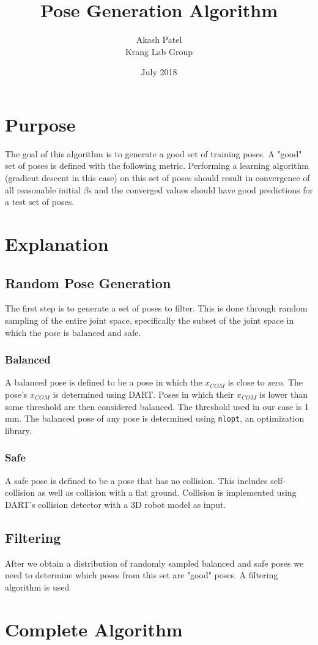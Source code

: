 \documentclass[10pt, letterpaper]{article}
\title{Pose Generation Algorithm}
\author{Akash Patel\\ Krang Lab Group}
\date{July 2018}
\begin{document}
\maketitle

\section{Purpose}

The goal of this algorithm is to generate a good set of training poses. A "good"
set of poses is defined with the following metric. Performing a learning
algorithm (gradient descent in this case) on this set of poses should result in
convergence of all reasonable initial $\beta$s and the converged values should
have good predictions for a test set of poses.

\section{Explanation}

\subsection{Random Pose Generation}

The first step is to generate a set of poses to filter. This is done through
random sampling of the entire joint space, specifically the subset of the joint
space in which the pose is balanced and safe.

\subsubsection{Balanced}
A balanced pose is defined to be a pose in which the $x_{COM}$ is close to
zero. The pose's $x_{COM}$ is determined using DART. Poses in which their
$x_{COM}$ is lower than some threshold are then considered balanced. The
threshold used in our case is 1 mm. The balanced pose of any pose is determined
using \texttt{nlopt}, an optimization library.

\subsubsection{Safe}
A safe pose is defined to be a pose that has no collision. This includes
self-collision as well as collision with a flat ground. Collision is implemented
using DART's collision detector with a 3D robot model as input.

\subsection{Filtering}
After we obtain a distribution of randomly sampled balanced and safe poses we
need to determine which poses from this set are "good" poses. A filtering
algorithm is used

\section{Complete Algorithm}

\end{document}
